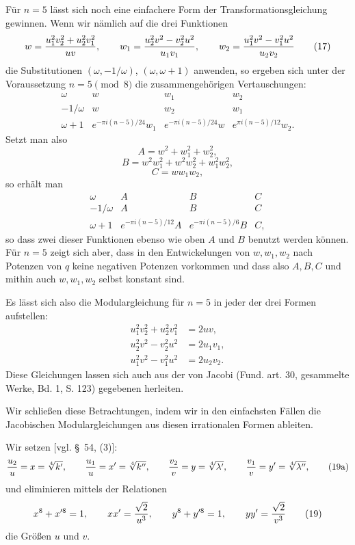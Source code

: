 \documentclass[11pt]{article}
\begin{document}
Für $n=5$ lässt sich noch eine einfachere Form der Transformationsgleichung gewinnen. Wenn wir nämlich auf die drei Funktionen
\begin{equation}
 w={u_1^2v_2^2+u_2^2v_1^2\over uv},\qquad
 w_1={u_2^2v^2-v_2^2u^2\over u_1v_1},\qquad
 w_2={u_1^2v^2-v_1^2u^2\over u_2v_2}
\tag{17}
\end{equation}
die Substitutionen $(\omega,-1/\omega)$, $(\omega,\omega+1)$ anwenden, so ergeben sich unter der Voraussetzung $n=5\pmod8$ die zusammengehörigen Vertauschungen:
\[
\begin{array}{c|ccc}
\omega&w&w_1&w_2\\[0.2em]
-1/\omega&w&w_2&w_1\\[0.2em]
\omega+1&e^{-\pi i(n-5)/24}w_1&e^{-\pi i(n-5)/24}w&e^{\pi i(n-5)/12}w_2.
\end{array}
\]
Setzt man also
\[
 A=w^2+w_1^2+w_2^2,
\]
\[
 B=w^2w_1^2+w^2w_2^2+w_1^2w_2^2,
\]
\[
 C=ww_1w_2,
\]
so erhält man
\[
\begin{array}{c|ccc}
\omega&A&B&C\\[0.2em]
-1/\omega&A&B&C\\[0.2em]
\omega+1&e^{-\pi i(n-5)/12}A&e^{-\pi i(n-5)/6}B&C,
\end{array}
\]
so dass zwei dieser Funktionen ebenso wie oben $A$ und $B$ benutzt werden können. Für $n=5$ zeigt sich aber, dass in den Entwickelungen von $w,w_1,w_2$ nach Potenzen von $q$ keine negativen Potenzen vorkommen und dass also $A,B,C$ und mithin auch $w,w_1,w_2$ selbst konstant sind.

Es lässt sich also die Modulargleichung für $n=5$ in jeder der drei Formen aufstellen:
\begin{equation}
\begin{aligned}
 u_1^2v_2^2+u_2^2v_1^2&=2uv,\\
 u_2^2v^2-v_2^2u^2&=2u_1v_1,\\
 u_1^2v^2-v_1^2u^2&=2u_2v_2.
\end{aligned}
\tag{18}
\end{equation}
Diese Gleichungen lassen sich auch aus der von Jacobi (Fund. art. 30, gesammelte Werke, Bd. 1, S. 123) gegebenen herleiten.

Wir schließen diese Betrachtungen, indem wir in den einfachsten Fällen die Jacobischen Modulargleichungen aus diesen irrationalen Formen ableiten.

Wir setzen [vgl. \S~54, (3)]:
\begin{equation}
 {u_2\over u}=x=\sqrt[4]{k'},\qquad {u_1\over u}=x'=\sqrt[4]{k''},
\qquad
 {v_2\over v}=y=\sqrt[4]{\lambda'},\qquad {v_1\over v}=y'=\sqrt[4]{\lambda''},
\tag{19a}
\end{equation}
und eliminieren mittels der Relationen
\begin{equation}
 x^8+x'^8=1,
 \qquad xx'={\sqrt2\over u^3},
 \qquad
 y^8+y'^8=1,
 \qquad yy'={\sqrt2\over v^3}
\tag{19}
\end{equation}
die Größen $u$ und $v$.
\end{document}
